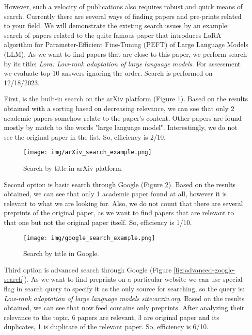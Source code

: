 \documentclass{article}
\begin{document}
    However, such a velocity of publications also requires robust and quick means of search. Currently there are several ways of finding papers and pre-prints related to your field. We will demonstrate the existing search issues by an example: search of papers related to the quite famous paper \cite{hu2021lora} that introduces LoRA algorithm for Parameter-Efficient Fine-Tuning (PEFT) of Large Language Models (LLM). As we want to find papers that are close to this paper, we perform search by its title: \textit{Lora: Low-rank adaptation of large language models}. For assessment we evaluate top-10 answers ignoring the order. Search is performed on 12/18/2023.
    
    First, is the built-in search on the arXiv platform (Figure \ref{fig:arxiv-search}). Based on the results obtained with a sorting based on decreasing relevance, we can see that only 2 academic papers somehow relate to the paper's content. Other papers are found mostly by match to the words "large language model". Interestingly, we do not see the original paper in the list. So, efficiency is 2/10.

    \begin{figure}[!tbh]
        \centering
        \texttt{[image: img/arXiv\_search\_example.png]}
        \caption{Search by title in arXiv platform.}
        \label{fig:arxiv-search}
    \end{figure}

    Second option is basic search through Google (Figure \ref{fig:google-search}). Based on the results obtained, we can see that only 1 academic paper found at all, however it is relevant to what we are looking for. Also, we do not count that there are several preprints of the original paper, as we want to find papers that are relevant to that one but not the original paper itself. So, efficiency is 1/10. 
    
    \begin{figure}[!tbh]
        \centering
        \texttt{[image: img/google\_search\_example.png]}
        \caption{Search by title in Google.}
        \label{fig:google-search}
    \end{figure}

    Third option is advanced search through Google (Figure \ref{fig:advanced-google-search}). As we want to find preprints on a particular website we can use special flag in search query to specify it as the only source for searching, so the query is: \textit{Low-rank adaptation of large language models site:arxiv.org}. Based on the results obtained, we can see that now feed contains only preprints. After analyzing their relevance to the topic, 6 papers are relevant, 3 are original paper and its duplicates, 1 is duplicate of the relevant paper. So, efficiency is 6/10.
\end{document}

